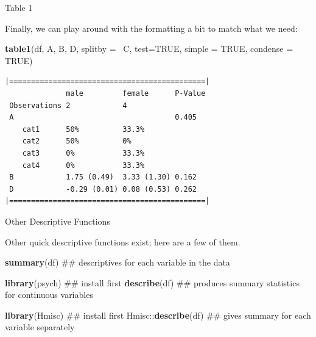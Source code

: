 \documentclass[10pt,ignorenonframetext,]{beamer}
\newenvironment{Shaded}{\begin{snugshade}}{\end{snugshade}}
\newcommand{\KeywordTok}[1]{\textcolor[rgb]{0.13,0.29,0.53}{\textbf{{#1}}}}
\newcommand{\DataTypeTok}[1]{\textcolor[rgb]{0.13,0.29,0.53}{{#1}}}
\newcommand{\OtherTok}[1]{\textcolor[rgb]{0.56,0.35,0.01}{{#1}}}
\newcommand{\NormalTok}[1]{{#1}}
\begin{document}
\begin{frame}[fragile]{Table 1}

Finally, we can play around with the formatting a bit to match what we
need:

\begin{Shaded}
\begin{Highlighting}[]
\KeywordTok{table1}\NormalTok{(df, A, B, D,}
       \DataTypeTok{splitby =} \NormalTok{~C,}
       \DataTypeTok{test=}\OtherTok{TRUE}\NormalTok{,}
       \DataTypeTok{simple =} \OtherTok{TRUE}\NormalTok{,}
       \DataTypeTok{condense =} \OtherTok{TRUE}\NormalTok{)}
\end{Highlighting}
\end{Shaded}

\tiny
\begin{verbatim}
|=============================================|
              male         female      P-Value
 Observations 2            4                  
 A                                     0.405  
    cat1      50%          33.3%              
    cat2      50%          0%                 
    cat3      0%           33.3%              
    cat4      0%           33.3%              
 B            1.75 (0.49)  3.33 (1.30) 0.162  
 D            -0.29 (0.01) 0.08 (0.53) 0.262  
|=============================================|
\end{verbatim}

\end{frame}


\begin{frame}[fragile]{Other Descriptive Functions}

Other quick descriptive functions exist; here are a few of them.

\begin{Shaded}
\begin{Highlighting}[]
\KeywordTok{summary}\NormalTok{(df)          ## descriptives for each variable in the data}

\KeywordTok{library}\NormalTok{(psych)       ## install first}
\KeywordTok{describe}\NormalTok{(df)         ## produces summary statistics for continuous variables}

\KeywordTok{library}\NormalTok{(Hmisc)       ## install first}
\NormalTok{Hmisc::}\KeywordTok{describe}\NormalTok{(df)  ## gives summary for each variable separately}
\end{Highlighting}
\end{Shaded}

\end{frame}
\end{document}
